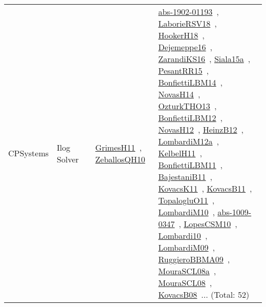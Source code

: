 {\begin{longtable}{lp{3cm}>{\raggedright\arraybackslash}p{6cm}>{\raggedright\arraybackslash}p{6cm}>{\raggedright\arraybackslash}p{8cm}}
CPSystems & Ilog Solver &  & \href{works/GrimesH11.pdf}{GrimesH11}~\cite{GrimesH11}, \href{works/ZeballosQH10.pdf}{ZeballosQH10}~\cite{ZeballosQH10} & \href{works/abs-1902-01193.pdf}{abs-1902-01193}~\cite{abs-1902-01193}, \href{works/LaborieRSV18.pdf}{LaborieRSV18}~\cite{LaborieRSV18}, \href{works/HookerH18.pdf}{HookerH18}~\cite{HookerH18}, \href{works/Dejemeppe16.pdf}{Dejemeppe16}~\cite{Dejemeppe16}, \href{works/ZarandiKS16.pdf}{ZarandiKS16}~\cite{ZarandiKS16}, \href{works/Siala15a.pdf}{Siala15a}~\cite{Siala15a}, \href{works/PesantRR15.pdf}{PesantRR15}~\cite{PesantRR15}, \href{works/BonfiettiLBM14.pdf}{BonfiettiLBM14}~\cite{BonfiettiLBM14}, \href{works/NovasH14.pdf}{NovasH14}~\cite{NovasH14}, \href{works/OzturkTHO13.pdf}{OzturkTHO13}~\cite{OzturkTHO13}, \href{works/BonfiettiLBM12.pdf}{BonfiettiLBM12}~\cite{BonfiettiLBM12}, \href{works/NovasH12.pdf}{NovasH12}~\cite{NovasH12}, \href{works/HeinzB12.pdf}{HeinzB12}~\cite{HeinzB12}, \href{works/LombardiM12a.pdf}{LombardiM12a}~\cite{LombardiM12a}, \href{works/KelbelH11.pdf}{KelbelH11}~\cite{KelbelH11}, \href{works/BonfiettiLBM11.pdf}{BonfiettiLBM11}~\cite{BonfiettiLBM11}, \href{works/BajestaniB11.pdf}{BajestaniB11}~\cite{BajestaniB11}, \href{works/KovacsK11.pdf}{KovacsK11}~\cite{KovacsK11}, \href{works/KovacsB11.pdf}{KovacsB11}~\cite{KovacsB11}, \href{works/TopalogluO11.pdf}{TopalogluO11}~\cite{TopalogluO11}, \href{works/LombardiM10.pdf}{LombardiM10}~\cite{LombardiM10}, \href{works/abs-1009-0347.pdf}{abs-1009-0347}~\cite{abs-1009-0347}, \href{works/LopesCSM10.pdf}{LopesCSM10}~\cite{LopesCSM10}, \href{works/Lombardi10.pdf}{Lombardi10}~\cite{Lombardi10}, \href{works/LombardiM09.pdf}{LombardiM09}~\cite{LombardiM09}, \href{works/RuggieroBBMA09.pdf}{RuggieroBBMA09}~\cite{RuggieroBBMA09}, \href{works/MouraSCL08a.pdf}{MouraSCL08a}~\cite{MouraSCL08a}, \href{works/MouraSCL08.pdf}{MouraSCL08}~\cite{MouraSCL08}, \href{works/KovacsB08.pdf}{KovacsB08}~\cite{KovacsB08}... (Total: 52)\\

\end{longtable}}
